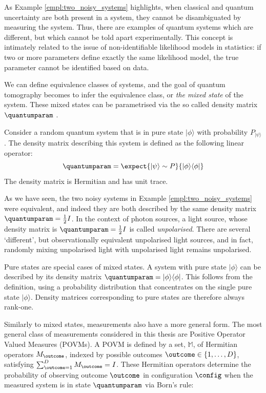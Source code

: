 As Example \ref{empl:two_noisy_systems} highlights, when classical and quantum uncertainty are both present in a system, they cannot be disambiguated by measuring the system. Thus, there are examples of quantum systems which are different, but which cannot be told apart experimentally. This concept is intimately related to the issue of non-identifiable likelihood models \citep{Teicher1961} in statistics: if two or more parameters define exactly the same likelihood model, the true parameter cannot be identified based on data.

We can define equivalence classes of systems, and the goal of quantum tomography becomes to infer the equivalence class, or \emph{the mixed state} of the system. These mixed states can be parametrised via the so called density matrix $\quantumparam$ \citep{Fano1957}.

\begin{definition}
Consider a random quantum system that is in pure state $\vert\phi\rangle$ with probability $P_{\vert\psi\rangle}$. The density matrix describing this system is defined as the following linear operator:
\begin{equation}
	\quantumparam = \expect{\vert\psi\rangle\sim P}{\vert\phi\rangle\langle\phi\vert}
\end{equation}
The density matrix is Hermitian and has unit trace.
\end{definition}

As we have seen, the two noisy systems in Example \ref{empl:two_noisy_systems} were equivalent, and indeed they are both described by the same density matrix $\quantumparam=\frac{1}{2}I$. In the context of photon sources, a light source, whose density matrix is $\quantumparam=\frac{1}{2}I$ is called \emph{unpolarised}. There are several `different', but observationally equivalent unpolarised light sources, and in fact, randomly mixing unpolarised light with unpolarised light remains unpolarised.

Pure states are special cases of mixed states. A system with pure state $\vert \phi \rangle$ can be described by its density matrix $\quantumparam = \vert \phi \rangle \langle \phi \vert$. This follows from the definition, using a probability distribution that concentrates on the single pure state $\vert \phi \rangle$. Density matrices corresponding to pure states are therefore always rank-one.

Similarly to mixed states, measurements also have a more general form. The most general class of measurements considered in this thesis are Positive Operator Valued Measures (POVMs). A POVM is defined by a set, $\mathbb{M}$, of Hermitian operators $M_{\outcome}$, indexed by possible outcomes $\outcome\in\{1,\ldots,D\}$, satisfying $\sum_{\outcome=1}^{D} M_{\outcome} = I$. These Hermitian operators determine the probability of observing outcome $\outcome$ in configuration $\config$ when the measured system is in state $\quantumparam$ via Born's rule:

